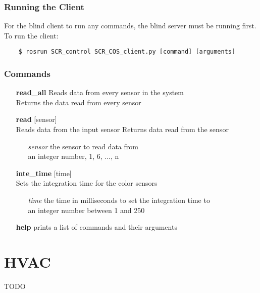 \documentclass[twoside]{article}
\begin{document}
	\subsubsection{Running the Client}
		For the blind client to run any commands, the blind server must be running first.\\
	To run the client:
	\begin{verbatim}
	$ rosrun SCR_control SCR_COS_client.py [command] [arguments]
	\end{verbatim}
	\subsubsection{Commands}
	\begin{enumerate}
		\item[\bf read\_all] Reads data from every sensor in the system\\
		Returns the data read from every sensor
		\item[\bf read] [sensor]\\
		Reads data from the input sensor
		Returns data read from the sensor
		\begin{enumerate}[leftmargin=3\parindent]
			\item[\it sensor] the sensor to read data from\\
			an integer number, 1, 6, ..., n
		\end{enumerate}
	\item[\bf inte\_time] [time]\\
	Sets the integration time for the color sensors
	\begin{enumerate}[leftmargin=3\parindent]
		\item[\it time] the time in milliseconds to set the integration time to\\
		an integer number between 1 and 250
	\end{enumerate}
		\item[\bf help] prints a list of commands and their arguments
	\end{enumerate}
	
	\section{HVAC}
	TODO
\end{document}
